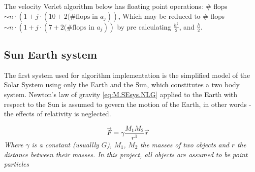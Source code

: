\documentclass[%
oneside,                 %
final,                   %
10pt]{article}
\begin{document}
The velocity Verlet algorithm below has floating point operations: \newline
\# flops$\sim n \cdot (1+j \cdot (10+2\text{(\#flops in } a_j))$, 
Which may be reduced to \# flops$\sim n \cdot (1+j \cdot (7+2\text{(\#flops in } a_j))$ by pre calculating $\frac{h^2}{2}$, and $ \frac{h}{2}$.
\begin{center}\end{center}
  
  
  
\subsection{Sun Earth system}                                                                                                               
\label{subsec:SEsys}
The first system used for algorithm implementation is the simplified model of the Solar System using only the Earth and the Sun, which constitutes a two body system. Newton's law of gravity \eqref{eq:M.SEsys.NLG} applied to the Earth with respect to the Sun  is assumed to govern the motion of the Earth, in other words - the effects of relativity is neglected. \newline


\begin{equation}
\vec{F}=\gamma \frac{M_1 M_2}{r^3}\vec{r}
\label{eq:M.SEsys.NLG}
\end{equation} 
\textit{Where $\gamma$ is a constant (usuallly $G$), $M_1$, $M_2$  the masses of two objects and $r$ the distance between their masses. In this project, all objects are assumed to be point particles} \newline
\end{document}
